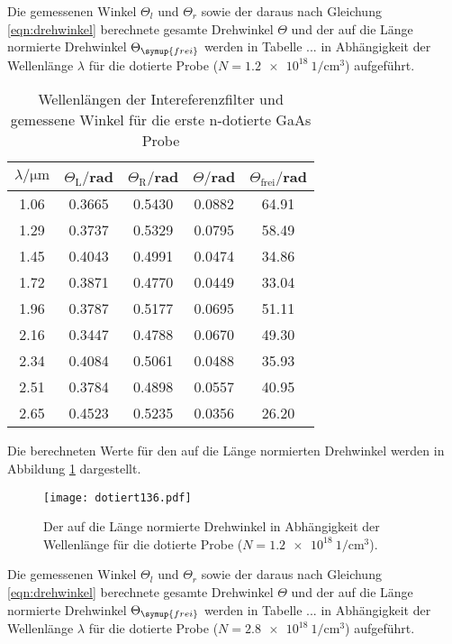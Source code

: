 Die gemessenen Winkel $\Theta_l$ und $\Theta_r$ sowie der daraus nach Gleichung
\ref{eqn:drehwinkel} berechnete gesamte Drehwinkel $\Theta$ und der auf die Länge
normierte Drehwinkel $\Theta_\symup{frei}$ werden in Tabelle ... in Abhängigkeit
der Wellenlänge $\lambda$ für die dotierte Probe ($N = \SI{1.2e18}{1\per\centi\meter^3}$) aufgeführt.

\begin{table}[H]
  \centering
  \caption{Wellenlängen der Intereferenzfilter und gemessene Winkel für die erste n-dotierte GaAs Probe}
  \label{tab:Parameter}
  \begin{tabular}{c c c c c}
    \toprule
    $\lambda/\mathrm{\mu m}$ & $\Theta_{\mathrm{L}}/$rad & $\Theta_{\mathrm{R}}/$rad  & $\Theta /$rad & $\Theta_{\mathrm{frei}}/$rad\\
    \midrule
    1.06  & 0.3665 & 0.5430 & 0.0882 & 64.91 \\
    1.29  & 0.3737 & 0.5329 & 0.0795 & 58.49 \\
    1.45  & 0.4043 & 0.4991 & 0.0474 & 34.86 \\
    1.72  & 0.3871 & 0.4770 & 0.0449 & 33.04 \\
    1.96  & 0.3787 & 0.5177 & 0.0695 & 51.11 \\
    2.16  & 0.3447 & 0.4788 & 0.0670 & 49.30 \\
    2.34  & 0.4084 & 0.5061 & 0.0488 & 35.93 \\
    2.51  & 0.3784 & 0.4898 & 0.0557 & 40.95 \\
    2.65  & 0.4523 & 0.5235 & 0.0356 & 26.20 \\
    \bottomrule
  \end{tabular}
\end{table}



Die berechneten Werte für den auf die Länge normierten Drehwinkel werden
in Abbildung \ref{fig:rein} dargestellt.
\begin{figure}[H]
  \centering
  \texttt{[image: dotiert136.pdf]}
  \caption{Der auf die Länge normierte Drehwinkel in Abhängigkeit der Wellenlänge für die dotierte Probe ($N = \SI{1.2e18}{1\per\centi\meter^3}$).}
  \label{fig:rein}
\end{figure}

Die gemessenen Winkel $\Theta_l$ und $\Theta_r$ sowie der daraus nach Gleichung
\ref{eqn:drehwinkel} berechnete gesamte Drehwinkel $\Theta$ und der auf die Länge
normierte Drehwinkel $\Theta_\symup{frei}$ werden in Tabelle ... in Abhängigkeit
der Wellenlänge $\lambda$ für die dotierte Probe ($N = \SI{2.8e18}{1\per\centi\meter^3}$) aufgeführt.

